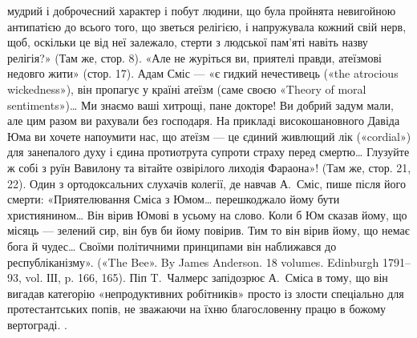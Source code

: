 {мудрий і доброчесний характер і побут людини, що була пройнята невигойною
антипатією до всього того, що зветься релігією, і напружувала
кожний свій нерв, щоб, оскільки це від неї залежало, стерти з людської
пам’яті навіть назву релігія?» (Там же, стор. 8). «Але не журіться ви,
приятелі правди, атеїзмові недовго жити» (стор. 17). Адам Сміс — «є
гидкий нечестивець («the atrocious wickedness»), він пропагує у країні
атеїзм (саме своєю «Theory of moral sentiments»)\dots{} Ми знаємо ваші хитрощі,
пане докторе! Ви добрий задум мали, але цим разом ви рахували без господаря.
На прикладі високошановного Давіда Юма ви хочете напоумити
нас, що атеїзм — це єдиний живлющий лік («cordial») для занепалого
духу і єдина протиотрута супроти страху перед смертю\dots{} Глузуйте ж
собі з руїн Вавилону та вітайте озвірілого лиходія Фараона»! (Там же,
стор. 21, 22). Один з ортодоксальних слухачів колегії, де навчав А.~Сміс,
пише після його смерти: «Приятелювання Сміса з Юмом\dots{} перешкоджало
йому бути християнином\dots{} Він вірив Юмові в усьому на слово.
Коли б Юм сказав йому, що місяць — зелений сир, він був би йому повірив.
Тим то він вірив йому, що немає бога й чудес\dots{} Своїми політичними
принципами він наближався до республіканізму». («The Bee». By James
Anderson. 18 volumes. Edinburgh 1791--93, vol. ІІІ, p. 166, 165). Піп
T.~Чалмерс запідозрює А.~Сміса в тому, що він вигадав категорію «непродуктивних
робітників» просто із злости спеціально для протестантських
попів, не зважаючи на їхню благословенну працю в божому вертограді.
}.

